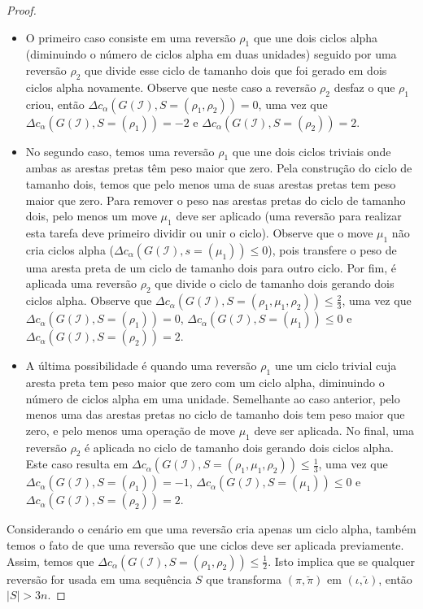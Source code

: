 \begin{proof}
\begin{itemize}
  \item O primeiro caso consiste em uma reversão $\rho_1$ que une dois ciclos alpha (diminuindo o número de ciclos alpha em duas unidades) seguido por uma reversão $\rho_2$ que divide esse ciclo de tamanho dois que foi gerado em dois ciclos alpha novamente. Observe que neste caso a reversão $\rho_2$ desfaz o que $\rho_1$ criou, então $\Delta c_{\alpha}(G(\mathcal{I}), S=(\rho_1,\rho_2)) = 0 $, uma vez que $\Delta c_{\alpha}(G(\mathcal{I}), S=(\rho_1)) = -2$ e $\Delta c_{\alpha}(G(\mathcal{I}), S=(\rho_2)) = 2$.
  \item No segundo caso, temos uma reversão $\rho_1$ que une dois ciclos triviais onde ambas as arestas pretas têm peso maior que zero. Pela construção do ciclo de tamanho dois, temos que pelo menos uma de suas arestas pretas tem peso maior que zero. Para remover o peso nas arestas pretas do ciclo de tamanho dois, pelo menos um move $\mu_1$ deve ser aplicado (uma reversão para realizar esta tarefa deve primeiro dividir ou unir o ciclo). Observe que o move $\mu_1$ não cria ciclos alpha ($\Delta c_{\alpha}(G(\mathcal{I}), s=(\mu_1)) \le 0$), pois transfere o peso de uma aresta preta de um ciclo de tamanho dois para outro ciclo. Por fim, é aplicada uma reversão $\rho_2$ que divide o ciclo de tamanho dois gerando dois ciclos alpha. Observe que $\Delta c_{\alpha}(G(\mathcal{I}), S=(\rho_1,\mu_1,\rho_2)) \le \frac{2}{3}$, uma vez que $\Delta c_{ \alpha}(G(\mathcal{I}), S=(\rho_1)) = 0$, $\Delta c_{\alpha}(G(\mathcal{I}), S=(\mu_1)) \le 0$ e $\Delta c_{\alpha}(G(\mathcal{I}), S=(\rho_2)) = 2$.
  \item A última possibilidade é quando uma reversão $\rho_1$ une um ciclo trivial cuja aresta preta tem peso maior que zero com um ciclo alpha, diminuindo o número de ciclos alpha em uma unidade. Semelhante ao caso anterior, pelo menos uma das arestas pretas no ciclo de tamanho dois tem peso maior que zero, e pelo menos uma operação de move $\mu_1$ deve ser aplicada. No final, uma reversão $\rho_2$ é aplicada no ciclo de tamanho dois gerando dois ciclos alpha. Este caso resulta em $\Delta c_{\alpha}(G(\mathcal{I}), S=(\rho_1,\mu_1,\rho_2)) \le \frac{1}{3}$, uma vez que $\Delta c_{\alpha}(G(\mathcal{I}), S=(\rho_1)) = -1$, $\Delta c_{\alpha}(G(\mathcal{I}), S=(\mu_1)) \le 0$ e $\Delta c_{\alpha}(G(\mathcal{I}), S=(\rho_2)) = 2$.
\end{itemize}

Considerando o cenário em que uma reversão cria apenas um ciclo alpha, também temos o fato de que uma reversão que une ciclos deve ser aplicada previamente. Assim, temos que $\Delta c_{\alpha}(G(\mathcal{I}), S=(\rho_1,\rho_2)) \le \frac{1}{2}$. Isto implica que se qualquer reversão for usada em uma sequência $S$ que transforma $(\pi,\breve\pi)$ em $(\iota,\breve\iota)$, então $|S| > 3n$.


\end{proof}
